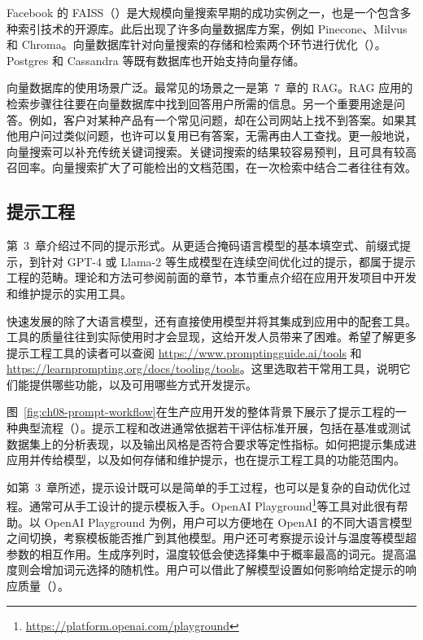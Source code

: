 Facebook 的 FAISS（）是大规模向量搜索早期的成功实例之一，也是一个包含多种索引技术的开源库。此后出现了许多向量数据库方案，例如 Pinecone、Milvus 和 Chroma。向量数据库针对向量搜索的存储和检索两个环节进行优化（）。Postgres 和 Cassandra 等既有数据库也开始支持向量存储。

向量数据库的使用场景广泛。最常见的场景之一是第~7~章的 RAG。RAG 应用的检索步骤往往要在向量数据库中找到回答用户所需的信息。另一个重要用途是问答。例如，客户对某种产品有一个常见问题，却在公司网站上找不到答案。如果其他用户问过类似问题，也许可以复用已有答案，无需再由人工查找。更一般地说，向量搜索可以补充传统关键词搜索。关键词搜索的结果较容易预判，且可具有较高召回率。向量搜索扩大了可能检出的文档范围，在一次检索中结合二者往往有效。

\subsection{提示工程}
第~3~章介绍过不同的提示形式。从更适合掩码语言模型的基本填空式、前缀式提示，到针对 GPT-4 或 Llama-2 等生成模型在连续空间优化过的提示，都属于提示工程的范畴。理论和方法可参阅前面的章节，本节重点介绍在应用开发项目中开发和维护提示的实用工具。

快速发展的除了大语言模型，还有直接使用模型并将其集成到应用中的配套工具。工具的质量往往到实际使用时才会显现，这给开发人员带来了困难。希望了解更多提示工程工具的读者可以查阅 \url{https://www.promptingguide.ai/tools} 和 \url{https://learnprompting.org/docs/tooling/tools}。这里选取若干常用工具，说明它们能提供哪些功能，以及可用哪些方式开发提示。

图~\ref{fig:ch08-prompt-workflow}在生产应用开发的整体背景下展示了提示工程的一种典型流程（）。提示工程和改进通常依据若干评估标准开展，包括在基准或测试数据集上的分析表现，以及输出风格是否符合要求等定性指标。如何把提示集成进应用并传给模型，以及如何存储和维护提示，也在提示工程工具的功能范围内。



如第~3~章所述，提示设计既可以是简单的手工过程，也可以是复杂的自动优化过程。通常可从手工设计的提示模板入手。OpenAI Playground\footnote{\url{https://platform.openai.com/playground}}等工具对此很有帮助。以 OpenAI Playground 为例，用户可以方便地在 OpenAI 的不同大语言模型之间切换，考察模板能否推广到其他模型。用户还可考察提示设计与温度等模型超参数的相互作用。生成序列时，温度较低会使选择集中于概率最高的词元。提高温度则会增加词元选择的随机性。用户可以借此了解模型设置如何影响给定提示的响应质量（）。

